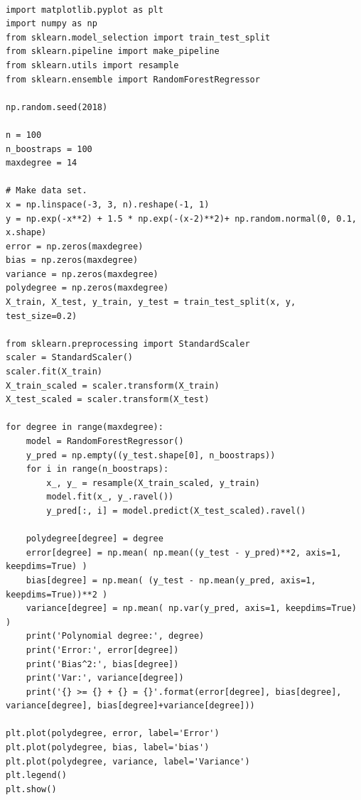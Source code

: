 \documentclass[%
oneside,                 %
final,                   %
10pt]{article}
\begin{document}
\begin{verbatim}

import matplotlib.pyplot as plt
import numpy as np
from sklearn.model_selection import train_test_split
from sklearn.pipeline import make_pipeline
from sklearn.utils import resample
from sklearn.ensemble import RandomForestRegressor

np.random.seed(2018)

n = 100
n_boostraps = 100
maxdegree = 14

# Make data set.
x = np.linspace(-3, 3, n).reshape(-1, 1)
y = np.exp(-x**2) + 1.5 * np.exp(-(x-2)**2)+ np.random.normal(0, 0.1, x.shape)
error = np.zeros(maxdegree)
bias = np.zeros(maxdegree)
variance = np.zeros(maxdegree)
polydegree = np.zeros(maxdegree)
X_train, X_test, y_train, y_test = train_test_split(x, y, test_size=0.2)

from sklearn.preprocessing import StandardScaler
scaler = StandardScaler()
scaler.fit(X_train)
X_train_scaled = scaler.transform(X_train)
X_test_scaled = scaler.transform(X_test)

for degree in range(maxdegree):
    model = RandomForestRegressor()
    y_pred = np.empty((y_test.shape[0], n_boostraps))
    for i in range(n_boostraps):
        x_, y_ = resample(X_train_scaled, y_train)
        model.fit(x_, y_.ravel())
        y_pred[:, i] = model.predict(X_test_scaled).ravel()

    polydegree[degree] = degree
    error[degree] = np.mean( np.mean((y_test - y_pred)**2, axis=1, keepdims=True) )
    bias[degree] = np.mean( (y_test - np.mean(y_pred, axis=1, keepdims=True))**2 )
    variance[degree] = np.mean( np.var(y_pred, axis=1, keepdims=True) )
    print('Polynomial degree:', degree)
    print('Error:', error[degree])
    print('Bias^2:', bias[degree])
    print('Var:', variance[degree])
    print('{} >= {} + {} = {}'.format(error[degree], bias[degree], variance[degree], bias[degree]+variance[degree]))

plt.plot(polydegree, error, label='Error')
plt.plot(polydegree, bias, label='bias')
plt.plot(polydegree, variance, label='Variance')
plt.legend()
plt.show()



\end{verbatim}




\end{document}
